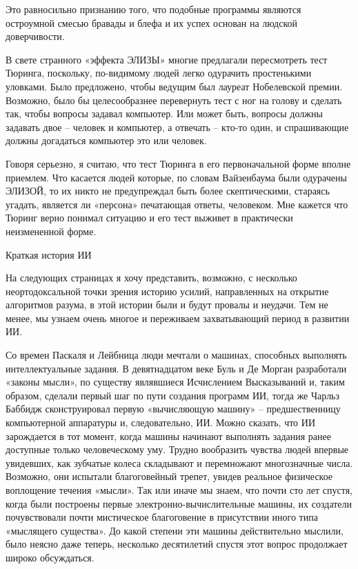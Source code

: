 \documentclass[../main.tex]{subfiles}
\begin{document}
Это равносильно признанию того, что подобные программы являются остроумной смесью бравады и блефа и их успех основан на людской доверчивости.

В свете странного «эффекта ЭЛИЗЫ» многие предлагали пересмотреть тест Тюринга, поскольку, по-видимому людей легко одурачить простенькими уловками. Было предложено, чтобы ведущим был лауреат Нобелевской премии. Возможно, было бы целесообразнее перевернуть тест с ног на голову и сделать так, чтобы вопросы задавал компьютер. Или может быть, вопросы должны задавать двое \--- человек и компьютер, а отвечать \--- кто-то один, и спрашивающие должны догадаться компьютер это или человек.

Говоря серьезно, я считаю, что тест Тюринга в его первоначальной форме вполне приемлем. Что касается людей которые, по словам Вайзенбаума были одурачены ЭЛИЗОЙ, то их никто не предупреждал быть более скептическими, стараясь угадать, является ли «персона» печатающая ответы, человеком. Мне кажется что Тюринг верно понимал ситуацию и его тест выживет в практически неизмененной форме.

Краткая история ИИ

На следующих страницах я хочу представить, возможно, с несколько неортодоксальной точки зрения историю усилий, направленных на открытие алгоритмов разума, в этой истории были и будут провалы и неудачи. Тем не менее, мы узнаем очень многое и переживаем захватывающий период в развитии ИИ.

Со времен Паскаля и Лейбница люди мечтали о машинах, способных выполнять интеллектуальные задания. В девятнадцатом веке Буль и Де Морган разработали «законы мысли», по существу являвшиеся Исчислением Высказываний и, таким образом, сделали первый шаг по пути создания программ ИИ, тогда же Чарльз Баббидж сконструировал первую «вычисляющую машину» \--- предшественницу компьютерной аппаратуры и, следовательно, ИИ\@. Можно сказать, что ИИ зарождается в тот момент, когда машины начинают выполнять задания ранее доступные только человеческому уму. Трудно вообразить чувства людей впервые увидевших, как зубчатые колеса складывают и перемножают многозначные числа. Возможно, они испытали благоговейный трепет, увидев реальное физическое воплощение течения «мысли». Так или иначе мы знаем, что почти сто лет спустя, когда были построены первые электронно-вычислительные машины, их создатели почувствовали почти мистическое благоговение в присутствии иного типа «мыслящего существа». До какой степени эти машины действительно мыслили, было неясно даже теперь, несколько десятилетий спустя этот вопрос продолжает широко обсуждаться.
\end{document}
